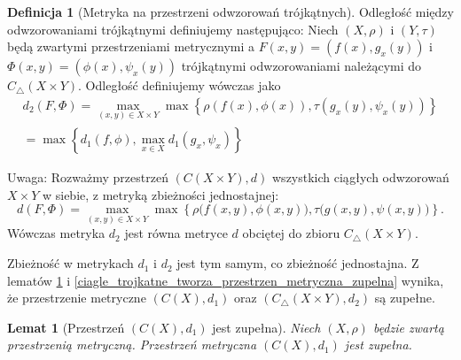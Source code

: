 \documentclass[licencjacka]{pwr_wmat_praca_dyplomowa}
\theoremstyle{plain}
\numberwithin{theorem}{chapter}
\newtheorem{lemma}[theorem]{Lemat}
\theoremstyle{definition}
\numberwithin{theorem}{chapter}
\newtheorem{definition}[theorem]{Definicja}
\begin{document}
\begin{definition}[Metryka na przestrzeni odwzorowań trójkątnych]
\label{definicja_metryki_d_dwa}
Odległość między odwzorowaniami trójkątnymi definiujemy następująco: Niech $(X, \rho)$ i $(Y, \tau)$ będą zwartymi przestrzeniami metrycznymi a $F(x,y) = (f(x), g_x(y))$ i $\Phi(x,y) = (\phi(x), \psi_x(y))$ trójkątnymi odwzorowaniami należącymi do $C_\triangle(X \times Y)$. Odległość definiujemy wówczas jako 
\begin{align*}
d_2(F, \Phi) = \max_{(x,y) \in X \times Y} \max\left\{\rho(f(x),\phi(x)), \tau(g_x(y), \psi_x(y))\right\} \\ 
= \max\left\{d_1(f,\phi), \max_{x \in X}d_1(g_x, \psi_x)\right\}
\end{align*}
\end{definition}

Uwaga: Rozważmy przestrzeń $(C(X \times Y), d)$ wszystkich ciągłych odwzorowań $X \times Y$ w siebie, z metryką zbieżności jednostajnej: 
$$d(F, \Phi) = \max_{(x,y) \in X \times Y} \max \left\{ \rho\big(f(x,y), \phi(x,y)\big), \tau\big(g(x,y), \psi(x,y)\big) \right\}.$$ 
Wówczas metryka $d_2$ jest równa metryce $d$ obciętej do zbioru $C_\triangle(X \times Y).$

Zbieżność w metrykach $d_1$ i $d_2$ jest tym samym, co zbieżność jednostajna.
Z lematów \ref{przestrzen_ciaglych_jest_zupelna} i \ref{ciagle_trojkatne_tworza_przestrzen_metryczna_zupelna} wynika, że przestrzenie metryczne $(C(X), d_1)$ oraz $(C_\triangle(X \times Y), d_2)$ są zupełne.


\begin{lemma}[Przestrzeń $(C(X), d_1)$ jest zupełna]\label{przestrzen_ciaglych_jest_zupelna}
Niech $(X, \rho)$ będzie zwartą przestrzenią metryczną. Przestrzeń metryczna $(C(X), d_1)$ jest zupełna.
\end{lemma}
\end{document}
